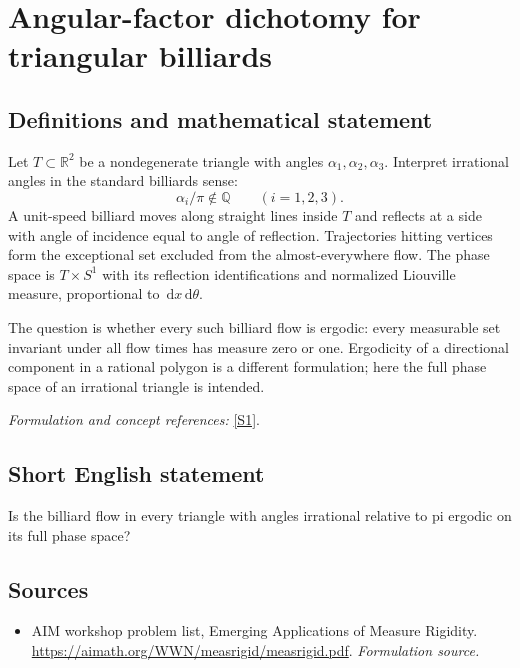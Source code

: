 \documentclass[11pt]{article}
\begin{document}
\section*{\texorpdfstring{Angular-factor dichotomy for triangular billiards}{Angular-factor dichotomy for triangular billiards}}\label{20003342}
\subsection{Definitions and mathematical statement}
Let $T\subset{\mathbb{R}}^2$ be a nondegenerate triangle with angles $\alpha_1,\alpha_2,\alpha_3$. Interpret irrational angles in the standard billiards sense:
\[
 \alpha_i/\pi\notin{\mathbb{Q}}\qquad(i=1,2,3).
\]
A unit-speed billiard moves along straight lines inside $T$ and reflects at a side with angle of incidence equal to angle of reflection. Trajectories hitting vertices form the exceptional set excluded from the almost-everywhere flow. The phase space is $T\times S^1$ with its reflection identifications and normalized Liouville measure, proportional to ${\,\mathrm{d}} x{\,\mathrm{d}}\theta$.

The question is whether every such billiard flow is ergodic: every measurable set invariant under all flow times has measure zero or one. Ergodicity of a directional component in a rational polygon is a different formulation; here the full phase space of an irrational triangle is intended.
\par\smallskip\textit{Formulation and concept references:} \href{https://aimath.org/WWN/measrigid/measrigid.pdf}{[S1]}.

\subsection{Short English statement}
Is the billiard flow in every triangle with angles irrational relative to pi ergodic on its full phase space?
\subsection{Sources}
\begin{itemize}
\item[S1]AIM workshop problem list, Emerging Applications of Measure Rigidity.
\url{https://aimath.org/WWN/measrigid/measrigid.pdf}.
\textit{Formulation source.}
\end{itemize}
\end{document}
